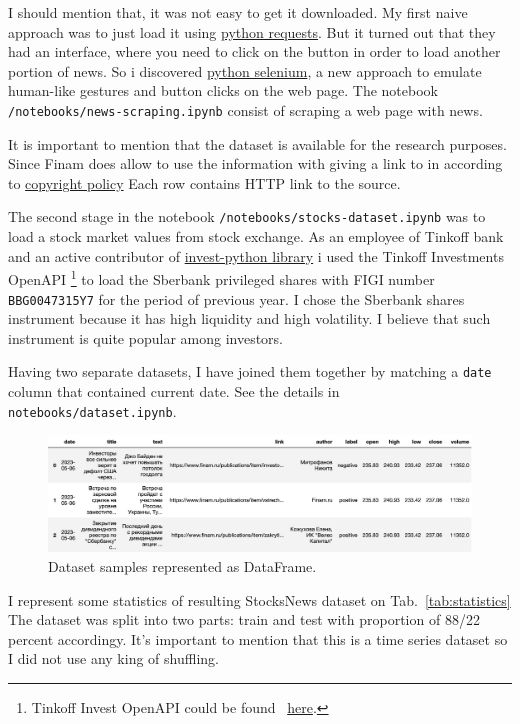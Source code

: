 \documentclass{article}
\begin{document}
I should mention that, it was not easy to get it downloaded. 
My first naive approach was to just load it using \href{https://pypi.org/project/requests/}{python requests}. But it turned out that they had an interface, where you need to click on the button in order to load another portion of news. So i discovered \href{https://pypi.org/project/selenium/}{python selenium}, a new approach to emulate human-like gestures and button clicks on the web page.
The notebook \texttt{/notebooks/news-scraping.ipynb} consist of scraping a web page with news.

It is important to mention that the dataset is available for the research purposes. 
Since Finam does allow to use the information with giving a link to in according to \href{https://www.finam.ru/about/copyright/}{copyright policy}
Each row contains HTTP link to the source.

The second stage in the notebook \texttt{/notebooks/stocks-dataset.ipynb} was to load a stock market values from stock exchange. 
As an employee of Tinkoff bank and an active contributor of \href{https://github.com/Tinkoff/invest-python}{invest-python library} i used the Tinkoff Investments OpenAPI \footnote{Tinkoff Invest OpenAPI could be found ~\href{https://www.tinkoff.ru/invest/open-api/}{here}.} to load the Sberbank privileged shares with FIGI number \texttt{BBG0047315Y7} for the period of previous year. I chose the Sberbank shares instrument because it has high liquidity and high volatility. I believe that such instrument is quite popular among investors.

Having two separate datasets, I have joined them together by matching a \texttt{date} column that contained current date. 
See the details in \texttt{notebooks/dataset.ipynb}.

\begin{figure}[!tbh]
    \centering
    \includegraphics[width=0.9\linewidth]{dataset.png}
    \caption{Dataset samples represented as DataFrame.}
    \label{datased}
\end{figure}

I represent some statistics of resulting StocksNews dataset on Tab.~\ref{tab:statistics} The dataset was split into two parts: train and test with proportion of 88/22 percent accordingy. It's important to mention that this is a time series dataset so I did not use any king of shuffling. 
\end{document}
